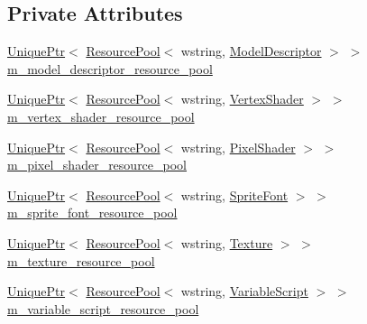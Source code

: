 \subsection*{Private Attributes}
\begin{DoxyCompactItemize}
\item 
\hyperlink{namespacemage_a8c307fbcc33bce9b7f2aa4c26c3b95cf}{Unique\+Ptr}$<$ \hyperlink{classmage_1_1_resource_pool}{Resource\+Pool}$<$ wstring, \hyperlink{classmage_1_1_model_descriptor}{Model\+Descriptor} $>$ $>$ \hyperlink{classmage_1_1_resource_manager_a26991ee1ef428871c8c7e1464613a36a}{m\+\_\+model\+\_\+descriptor\+\_\+resource\+\_\+pool}
\item 
\hyperlink{namespacemage_a8c307fbcc33bce9b7f2aa4c26c3b95cf}{Unique\+Ptr}$<$ \hyperlink{classmage_1_1_resource_pool}{Resource\+Pool}$<$ wstring, \hyperlink{classmage_1_1_vertex_shader}{Vertex\+Shader} $>$ $>$ \hyperlink{classmage_1_1_resource_manager_aee4af101fb42e8524121f18c16c76931}{m\+\_\+vertex\+\_\+shader\+\_\+resource\+\_\+pool}
\item 
\hyperlink{namespacemage_a8c307fbcc33bce9b7f2aa4c26c3b95cf}{Unique\+Ptr}$<$ \hyperlink{classmage_1_1_resource_pool}{Resource\+Pool}$<$ wstring, \hyperlink{classmage_1_1_pixel_shader}{Pixel\+Shader} $>$ $>$ \hyperlink{classmage_1_1_resource_manager_a139203cf050a3a8146f89b4b643d6092}{m\+\_\+pixel\+\_\+shader\+\_\+resource\+\_\+pool}
\item 
\hyperlink{namespacemage_a8c307fbcc33bce9b7f2aa4c26c3b95cf}{Unique\+Ptr}$<$ \hyperlink{classmage_1_1_resource_pool}{Resource\+Pool}$<$ wstring, \hyperlink{classmage_1_1_sprite_font}{Sprite\+Font} $>$ $>$ \hyperlink{classmage_1_1_resource_manager_a49369b160a75dee96cdebd2b957ae0c4}{m\+\_\+sprite\+\_\+font\+\_\+resource\+\_\+pool}
\item 
\hyperlink{namespacemage_a8c307fbcc33bce9b7f2aa4c26c3b95cf}{Unique\+Ptr}$<$ \hyperlink{classmage_1_1_resource_pool}{Resource\+Pool}$<$ wstring, \hyperlink{classmage_1_1_texture}{Texture} $>$ $>$ \hyperlink{classmage_1_1_resource_manager_aba76c2267b30ccae61c160497e8d8efc}{m\+\_\+texture\+\_\+resource\+\_\+pool}
\item 
\hyperlink{namespacemage_a8c307fbcc33bce9b7f2aa4c26c3b95cf}{Unique\+Ptr}$<$ \hyperlink{classmage_1_1_resource_pool}{Resource\+Pool}$<$ wstring, \hyperlink{classmage_1_1_variable_script}{Variable\+Script} $>$ $>$ \hyperlink{classmage_1_1_resource_manager_adc36ebb3e2d04fddc3a23e2f1303dbfe}{m\+\_\+variable\+\_\+script\+\_\+resource\+\_\+pool}
\end{DoxyCompactItemize}


